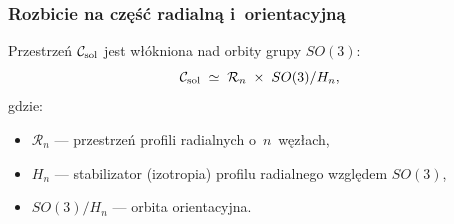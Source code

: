 \subsubsection{Rozbicie na cz\k{e}\'s\'c radialn\k{a} i~orientacyjn\k{a}}%
\label{sssec:radial-orientation}

\begin{proposition}%
\label{prop:C-sol-decomp}
Przestrze\'n $\mathcal{C}_{\rm sol}$ jest w\l{}\'okniona nad
orbity grupy $SO(3)$:
\begin{equation}\label{eq:fibration}
  \mathcal{C}_{\rm sol}
  \;\simeq\;
  \mathcal{R}_n \;\times\; SO(3)/H_n,
\end{equation}
gdzie:
\begin{itemize}[nosep]
  \item $\mathcal{R}_n$ --- przestrze\'n profili radialnych
        o~$n$~w\k{e}z\l{}ach,
  \item $H_n$ --- stabilizator (izotropia) profilu radialnego
        wzgl\k{e}dem $SO(3)$,
  \item $SO(3)/H_n$ --- orbita orientacyjna.
\end{itemize}
\end{proposition}

